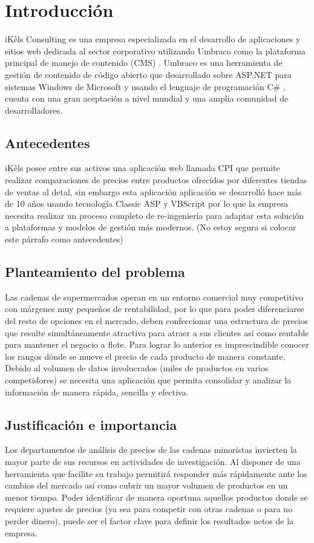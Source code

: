 \chapter*{Introducción}
iKêls Consulting \cite{ikels} es una empresa especializada en el desarrollo de aplicaciones y sitios web dedicada al sector corporativo utilizando Umbraco como la plataforma principal de manejo de contenido (CMS) \cite{cmsBarker}. Umbraco es una herramienta de gestión de contenido de código abierto que desarrollado sobre ASP.NET \cite{aspMicrosoft} para sistemas Windows de Microsoft y usando el lenguaje de programación C\# \cite{cSharpMicrosoft}, cuenta con una gran aceptación a nivel mundial y una amplia comunidad de desarrolladores.

\section*{Antecedentes}
 iKêls posee entre sus activos una aplicación web llamada CPI que permite realizar comparaciones de precios entre productos ofrecidos por diferentes tiendas de ventas al detal, sin embargo esta aplicación aplicación se desarrolló hace más de 10 años usando tecnología Classic ASP y VBScript por lo que la empresa necesita realizar un proceso completo de re-ingeniería para adaptar esta solución a plataformas y modelos de gestión más modernos. (No estoy segura si colocar este párrafo como antecedentes)


\section*{Planteamiento del problema}
Las cadenas de supermercados operan en un entorno comercial muy competitivo con márgenes muy pequeños de rentabilidad, por lo que para poder diferenciarse del resto de opciones en el mercado, deben confeccionar una estructura de precios que resulte simultáneamente atractiva para atraer a sus clientes así como rentable para mantener el negocio a flote.
Para lograr lo anterior es imprescindible conocer los rangos dónde  se mueve el precio de cada producto de manera constante. Debido al volumen de datos involucrados (miles de productos en varios competidores) se necesita una aplicación que permita consolidar y analizar la información de manera rápida, sencilla y efectiva.
\section*{Justificación e importancia}
Los departamentos de análisis de precios de las cadenas minoristas invierten la mayor parte de sus recursos en actividades de investigación.
Al disponer de una herramienta que facilite su trabajo permitirá responder más rápidamente ante los cambios del mercado así como cubrir un mayor volumen de productos en un menor  tiempo. Poder identificar de manera oportuna aquellos productos donde se requiere ajustes de precios (ya sea para competir con otras cadenas o para no perder dinero), puede ser el factor clave para definir los resultados netos de la empresa.
